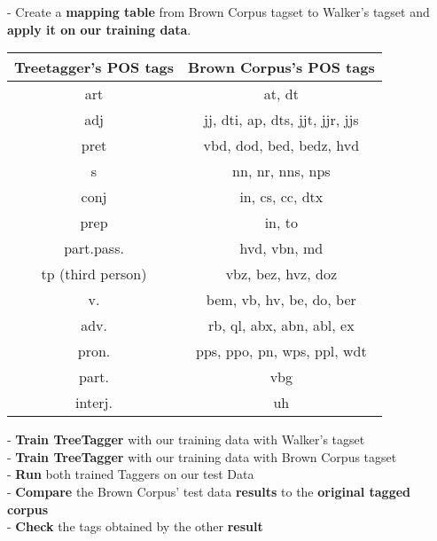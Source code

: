\begin{center}
- Create a \textbf{mapping table} from Brown Corpus tagset to Walker's tagset and \textbf{apply it on our training data}.  \\


\begin{center}
\begin{tabular}{c|c}
\hline
 \rowcolor[gray]{.75}
\textbf{Treetagger's POS tags} &  \textbf{Brown Corpus's POS tags} \\
\hline
art  &  at, dt \\
\hline
adj  &  jj, dti, ap, dts, jjt, jjr, jjs \\
\hline
pret  &  vbd, dod, bed, bedz, hvd \\
\hline
s  &  nn, nr, nns, nps \\
\hline
conj  &  in, cs, cc, dtx \\
\hline
prep  &  in, to \\
\hline
part.pass.  &  hvd, vbn, md \\
\hline
tp (third person)  &  vbz, bez, hvz, doz \\
\hline
v.  &  bem, vb, hv, be, do, ber \\
\hline
adv.  &   rb, ql, abx, abn, abl, ex \\
\hline
pron.  &  pps, ppo, pn, wps, ppl, wdt \\
\hline
part.  &  vbg \\
\hline
interj.  &  uh \\
\hline
\end{tabular}
\end{center}

- \textbf{Train TreeTagger} with our training data with Walker's tagset  \\[2mm]

- \textbf{Train TreeTagger} with our training data with Brown Corpus tagset \\[2mm]

- \textbf{Run }both trained Taggers on our test Data \\[2mm]

- \textbf{Compare} the Brown Corpus' test data \textbf{results} to the \textbf{original tagged corpus} \\[2mm]

- \textbf{Check} the tags obtained by the other \textbf{result }

\end{center}
